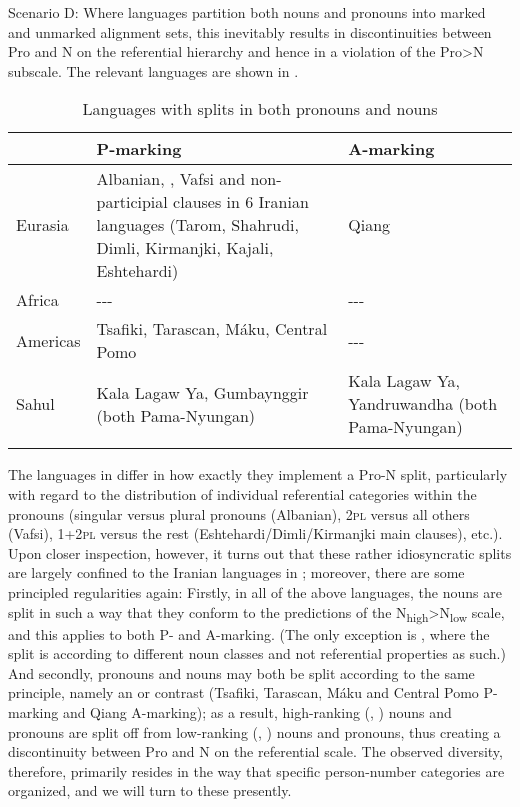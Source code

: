 \documentclass[output=paper]{langscibook}
\begin{document}
Scenario D: Where languages partition both nouns and pronouns into marked and unmarked alignment sets, this inevitably results in discontinuities between Pro and N on the referential hierarchy and hence in a violation of the Pro>N subscale. The relevant languages are shown in .

\begin{table}
\caption{Languages with splits in both pronouns and nouns}
\label{18-sc-tab:7}
\begin{tabularx}{\textwidth}{l@{\hspace{2em}}QQ}
\lsptoprule
& \bfseries P-marking   & \bfseries A-marking\\
\midrule
Eurasia & Albanian, , Vafsi and non-participial clauses in 6 Iranian languages (Tarom, Shahrudi, Dimli, Kirmanjki, Kajali, Eshtehardi) &  Qiang\\
Africa & {}-{}-{}- & {}-{}-{}-\\
Americas & Tsafiki, Tarascan, Máku, Central Pomo & {}-{}-{}-\\
Sahul & Kala Lagaw Ya, Gumbaynggir (both Pama-Nyungan)  & Kala Lagaw Ya, Yandruwandha (both Pama-Nyungan)\\
\lspbottomrule
\end{tabularx}
\end{table}

\largerpage
The languages in  differ in how exactly they implement a Pro-N split, particularly with regard to the distribution of individual referential categories within the pronouns (\eg singular versus plural pronouns (Albanian), 2\textsc{pl} versus all others (Vafsi), 1+2\textsc{pl} versus the rest (Eshtehardi/Dimli/Kirmanjki main clauses), etc.). Upon closer inspection, however, it turns out that these rather idiosyncratic splits are largely confined to the Iranian languages in ; moreover, there are some principled regularities again: Firstly, in all of the above languages, the nouns are split in such a way that they conform to the predictions of the N\textsubscript{high}>N\textsubscript{low} scale, and this applies to both P- and A-marking. (The only exception is , where the split is according to different noun classes and not referential properties as such.) And secondly, pronouns and nouns may both be split according to the same principle, namely an  or  contrast (\eg Tsafiki, Tarascan, Máku and Central Pomo P-marking and Qiang A-marking); as a result, high-ranking (, ) nouns and pronouns are split off from low-ranking (, ) nouns and pronouns, thus creating a discontinuity between Pro and N on the referential scale. The observed diversity, therefore, primarily resides in the way that specific person-number categories are organized, and we will turn to these presently.
\end{document}
